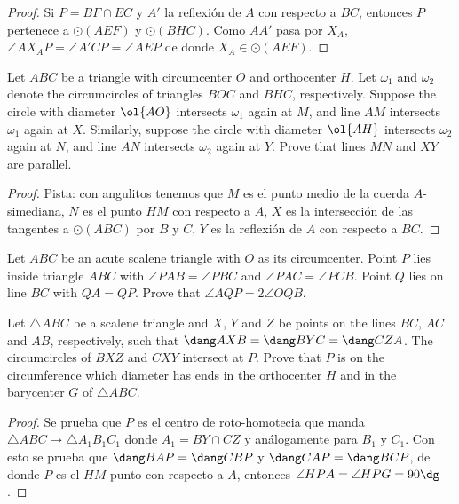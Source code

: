 \begin{proof}
	Si $P=BF\cap EC$ y $A'$ la reflexión de $A$ con respecto a $BC$, entonces $P$ pertenece a $\odot(AEF)$ y $\odot(BHC)$. Como $AA'$ pasa por $X_A$, $\angle AX_AP=\angle A'CP=\angle AEP$ de donde $X_A\in\odot(AEF)$.
\end{proof}

\begin{probEG}[ELMO 2014/5]
	Let $ABC$ be a triangle with circumcenter $O$ and orthocenter $H$. Let $\omega_1$ and $\omega_2$ denote the circumcircles of triangles $BOC$ and $BHC$, respectively. Suppose the circle with diameter $\ol{AO}$ intersects $\omega_1$ again at $M$, and line $AM$ intersects $\omega_1$ again at $X$. Similarly, suppose the circle with diameter $\ol{AH}$ intersects $\omega_2$ again at $N$, and line $AN$ intersects $\omega_2$ again at $Y$. Prove that lines $MN$ and $XY$ are parallel.
\end{probEG}

\begin{proof}
	Pista: con angulitos tenemos que $M$ es el punto medio de la cuerda $A$-simediana, $N$ es el punto $HM$ con respecto a $A$, $X$ es la intersección de las tangentes a $\odot(ABC)$ por $B$ y $C$, $Y$ es la reflexión de $A$ con respecto a $BC$.
\end{proof}

\begin{probEG}
	Let $ABC$ be an acute scalene triangle with $O$ as its circumcenter. Point $P$ lies inside triangle $ABC$ with $\angle PAB=\angle PBC$ and $\angle PAC=\angle PCB$. Point $Q$ lies on line $BC$ with $QA=QP$. Prove that $\angle AQP=2\angle OQB$.
\end{probEG}

\begin{probEG}
	Let $\triangle ABC$ be a scalene triangle and $X$, $Y$ and $Z$ be points on the lines $BC$, $AC$ and $AB$, respectively, such that $\dang AXB=\dang BYC=\dang CZA$. The circumcircles of $BXZ$ and $CXY$ intersect at $P$. Prove that $P$ is on the circumference which diameter has ends in the orthocenter $H$ and in the barycenter $G$ of $\triangle ABC$.
\end{probEG}

\begin{proof}
	Se prueba que $P$ es el centro de roto-homotecia que manda $\triangle ABC\mapsto\triangle A_1B_1C_1$ donde $A_1=BY\cap CZ$ y análogamente para $B_1$ y $C_1$. Con esto se prueba que $\dang BAP=\dang CBP$ y $\dang CAP=\dang BCP$, de donde $P$ es el $HM$ punto con respecto a $A$, entonces $\angle HPA=\angle HPG=90\dg$.
\end{proof}

